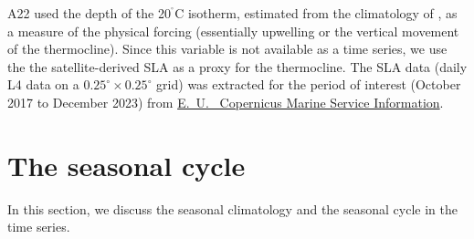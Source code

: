 \documentclass[authoryear,review,11pt]{elsarticle}
\newcommand{\cdigri}{{\ensuremath{^{^\circ}}\mathrm{C}}}
\newcommand{\chla}{chl-{\emph{a}}}
\begin{document}
A22 used the depth of the 20$\cdigri$ isotherm, estimated from the climatology of \citet{chatterjee2012new}, as a measure of the physical forcing (essentially upwelling or the vertical movement of the thermocline).  Since this variable is not available as a time series, we use the the satellite-derived SLA as a proxy for the thermocline.  The SLA data (daily L4 data on a $0.25^\circ \times 0.25^\circ$ grid) was extracted for the period of interest (October 2017 to December 2023) from \href{https://data.marine.copernicus.eu/product/SEALEVEL_GLO_PHY_CLIMATE_L4_MY_008_057/description}{E.~U.~ Copernicus Marine Service Information}.


%


\section{The seasonal cycle}
\label{sec:seasonal}

In this section, we discuss the seasonal climatology and the seasonal cycle in the time series.
\end{document}
